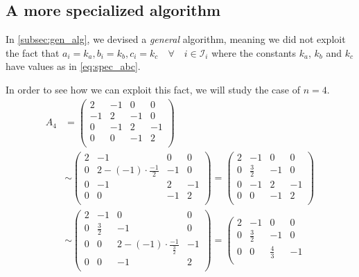 \documentclass[a4paper]{article}
\begin{document}
\subsection{A more specialized algorithm}
In \ref{subsec:gen_alg}, we devised a \emph{general} algorithm, meaning we did not exploit the fact that $a_i=k_a, b_i=k_b, c_i=k_c \quad \forall \quad i \in \mathcal{I}_i$ where the constants $k_a$, $k_b$ and $k_c$ have values as in  \eqref{eq:spec_abc}.

In order to see how we can exploit this fact, we will study the case of $n=4$.
\begin{align*}
A_4 &= \left(\begin{array}{ccccc}
   2 & -1 &  0 &  0 \\
  -1 &  2 & -1 &  0 \\
   0 & -1 &  2 & -1 \\
   0 &  0 & -1 &  2 \\
\end{array} \right)\\
&\sim
\left(\begin{array}{ccccc}
   2 & -1 &  0 &  0 \\
  0 &  2 - (-1)\cdot\frac{-1}{2} & -1 &  0 \\
   0 & -1 &  2 & -1 \\
   0 &  0 & -1 &  2 \\
\end{array} \right)
=
\left(\begin{array}{ccccc}
   2 & -1 &  0 &  0 \\
  0 &  \frac{3}{2} & -1 &  0 \\
   0 & -1 &  2 & -1 \\
   0 &  0 & -1 &  2 \\
\end{array} \right)\\
&\sim
\left(\begin{array}{ccccc}
   2 & -1 &  0 &  0 \\
  0 &  \frac{3}{2} & -1 &  0 \\
   0 &  0 &  2 - (-1)\cdot\frac{-1}{\frac{3}{2}} & -1 \\
   0 &  0 & -1 &  2 \\
\end{array} \right)
=
\left(\begin{array}{ccccc}
   2 & -1 &  0 &  0 \\
  0 &  \frac{3}{2} & -1 &  0 \\
   0 &  0 &  \frac{4}{3} & -1 \\

\end{array}
\end{align*}
\end{document}
